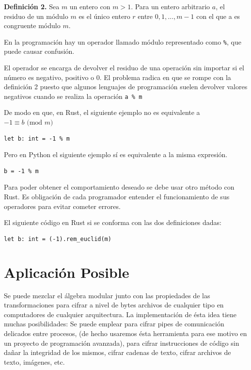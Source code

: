 \documentclass[a4paper]{article}
\begin{document}
\textbf{Definición 2.} Sea $m$ un entero con $m > 1$. Para un entero arbitrario
$a$, el residuo de un módulo $m$ es el único entero $r$ entre $0,1,...,m-1$ con
el que a es congruente módulo $m$.

\autocite{hill}

En la programación hay un operador llamado módulo representado como
\texttt{\%}, que puede causar confusión.

El operador se encarga de devolver el residuo de una operación sin importar si
el número es negativo, positivo o 0. El problema radica en que se rompe con la
definición 2 puesto que algunos lenguajes de programación suelen devolver
valores negativos cuando se realiza la operación \texttt{a \% m}

De modo en que, en Rust, el siguiente ejemplo no es equivalente a $-1 \equiv b
\text{ (mod }m\text{)}$

\begin{verbatim}
let b: int = -1 % m 
\end{verbatim}

Pero en Python el siguiente ejemplo sí es equivalente a la misma expresión.

\begin{verbatim}
b = -1 % m 
\end{verbatim}

Para poder obtener el comportamiento deseado se debe usar otro método con Rust.
Es obligación de cada programador entender el funcionamiento de sus operadores
para evitar cometer errores.

El siguiente código en Rust si se conforma con las dos definiciones dadas:

\begin{verbatim}
let b: int = (-1).rem_euclid(m)
\end{verbatim}

\section{Aplicación Posible}

Se puede mezclar el álgebra modular junto con las propiedades de las
transformaciones para cifrar a nivel de bytes archivos de cualquier tipo en
computadores de cualquier arquitectura. La implementación de ésta idea tiene
muchas posibilidades: Se puede emplear para cifrar pipes de comunicación
delicados entre procesos, (de hecho usaremos ésta herramienta para ese motivo
en un proyecto de programación avanzada), para cifrar instrucciones de código
sin dañar la integridad de los mismos, cifrar cadenas de texto, cifrar archivos
de texto, imágenes, etc.
\end{document}
